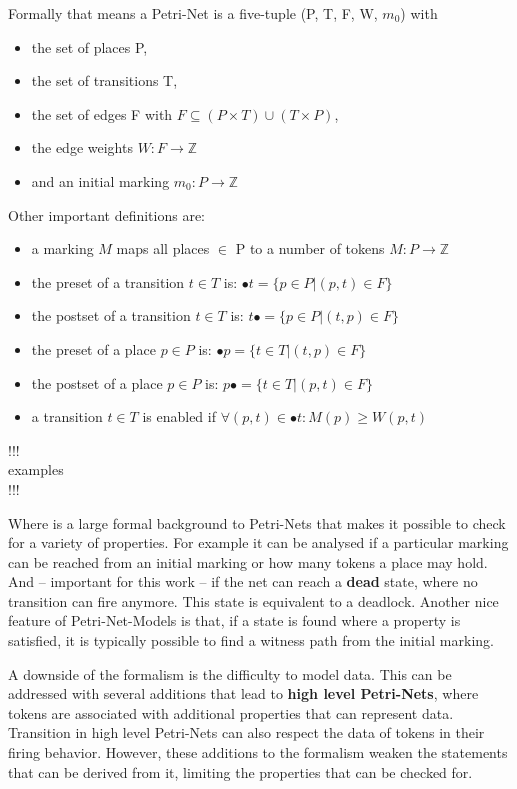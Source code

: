 Formally that means a Petri-Net is a five-tuple (P, T, F, W, $m_0$) with
\begin{itemize}
  \setlength\itemsep{-0.3em}
  \item the set of places P,
  \item the set of transitions T,
  \item the set of edges F with $F \subseteq (P \times T) \cup (T \times P)$,
  \item the edge weights $W: F \rightarrow \mathbb{Z} $
  \item and an initial marking $m_0: P \rightarrow \mathbb{Z} $
\end{itemize}
Other important definitions are:
\begin{itemize}
  \setlength\itemsep{-0.3em}
  \item a marking $M$ maps all places $\in$ P to a number of tokens $M: P \rightarrow \mathbb{Z}$
  \item the preset of a transition $t \in T$ is: $\bullet t = \{p \in P | (p,t) \in F\}$
  \item the postset of a transition $t \in T$ is: $t\bullet = \{p \in P | (t,p) \in F\}$
  \item the preset of a place $p \in P$ is: $\bullet p = \{t \in T | (t,p) \in F\}$
  \item the postset of a place $p \in P$ is: $p\bullet = \{t \in T | (p,t) \in F\}$
  \item a transition $t \in T$ is enabled if $\forall (p,t) \in \bullet t: M(p) \geq W(p,t)$
\end{itemize}
!!!\\
examples\\
!!!

Where is a large formal background to Petri-Nets that makes it possible to check for a variety of properties.
For example it can be analysed if a particular marking can be reached from an initial marking or how many tokens a place may hold.
And -- important for this work -- if the net can reach a \textbf{dead} state, where no transition can fire anymore.
This state is equivalent to a deadlock.
Another nice feature of Petri-Net-Models is that, if a state is found where a property is satisfied, it is typically possible to find a witness path from the initial marking.

A downside of the formalism is the difficulty to model data.
This can be addressed with several additions that lead to \textbf{high level Petri-Nets}, where tokens are associated with additional properties that can represent data.
Transition in high level Petri-Nets can also respect the data of tokens in their firing behavior.
However, these additions to the formalism weaken the statements that can be derived from it, limiting the properties that can be checked for.




